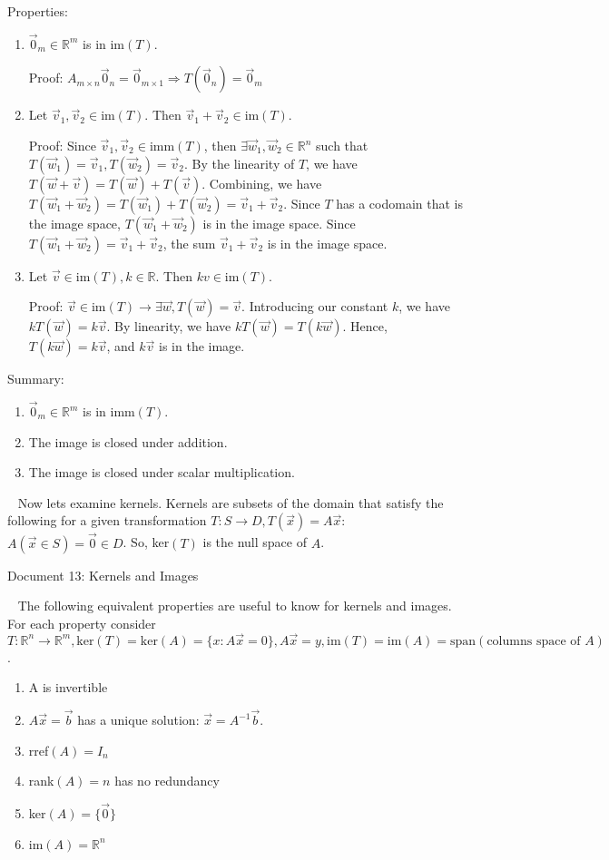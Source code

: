 \documentclass[12pt]{article}
\begin{document}
Properties:
\begin{enumerate}
\item $\vec{0}_m\in\mathbb{R}^m$ is in im$(T)$.

Proof: $A_{m\times n}\vec{0}_n=\vec{0}_{m\times 1}\Rightarrow T(\vec{0}_n)=\vec{0}_m$
\item Let $\vec{v}_1,\vec{v}_2\in\text{im}(T)$. Then $\vec{v}_1+\vec{v}_2\in\text{im}(T)$.

Proof: Since $\vec{v}_1,\vec{v}_2\in\text{imm}(T)$, then $\exists \vec{w}_1,\vec{w}_2\in\mathbb{R}^n$ such that $T(\vec{w}_1)=\vec{v}_1,T(\vec{w}_2)=\vec{v}_2$. By the linearity of $T$, we have $T(\vec{w}+\vec{v})=T(\vec{w})+T(\vec{v})$. Combining, we have $T(\vec{w}_1+\vec{w}_2)=T(\vec{w}_1)+T(\vec{w}_2)=\vec{v}_1+\vec{v}_2$. Since $T$ has a codomain that is the image space, $T(\vec{w}_1+\vec{w}_2)$ is in the image space. Since $T(\vec{w}_1+\vec{w}_2)=\vec{v}_1+\vec{v}_2$, the sum $\vec{v}_1+\vec{v}_2$ is in the image space.
\item Let $\vec{v}\in \text{im}(T), k\in\mathbb{R}$. Then $kv\in\text{im}(T)$.

Proof: $\vec{v}\in\text{im}(T)\rightarrow\exists\vec{w},T(\vec{w})=\vec{v}$. Introducing our constant $k$, we have $kT(\vec{w})=k\vec{v}$. By linearity, we have $kT(\vec{w})=T(k\vec{w})$. Hence, $T(k\vec{w})=k\vec{v}$, and $k\vec{v}$ is in the image.\\
\end{enumerate}

Summary:
\begin{enumerate}
\item $\vec{0}_m\in\mathbb{R}^m$ is in $\text{imm}(T)$.
\item The image is closed under addition.
\item The image is closed under scalar multiplication.\\
\end{enumerate}

$\,\,\,$ Now lets examine kernels. Kernels are subsets of the domain that satisfy the following for a given transformation $T:S\rightarrow D,T(\vec{x})=A\vec{x}$: $A(\vec{x}\in S)=\vec{0}\in D$. So, ker$(T)$ is the null space of $A$.

\newpage
\begin{center}
Document 13: Kernels and Images
\end{center}

\setlength{\leftskip}{0in}
$\,\,\,$ The following equivalent properties are useful to know for kernels and images. For each property consider $T:\mathbb{R}^n\rightarrow\mathbb{R}^m,\text{ker}(T)=\text{ker}(A)=\{x:A\vec{x}=0\},A\vec{x}=y,\text{im}(T)=\text{im}(A)=\text{span}(\text{columns space of }A)$.
\begin{enumerate}
\item A is invertible
\item $A\vec{x}=\vec{b}$ has a unique solution: $\vec{x}=A^{-1}\vec{b}$.
\item rref$(A)=I_n$
\item rank$(A)=n$ has no redundancy
\item ker$(A)=\{\vec{0}\}$
\item im$(A)=\mathbb{R}^n$
\end{enumerate}
\end{document}
